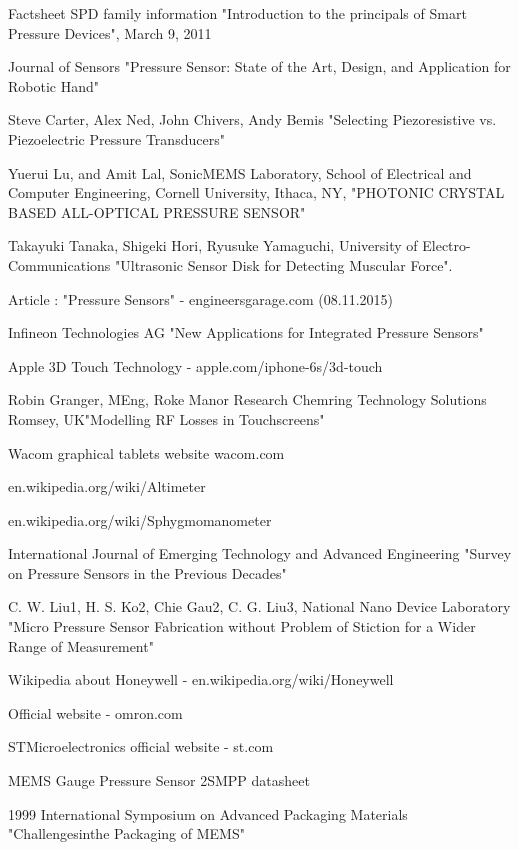 \documentclass[english]{article}
\begin{document}
\newpage

\begin{thebibliography}{1}

    Factsheet SPD family information "Introduction to the principals of Smart Pressure Devices", March 9, 2011
  
     Journal of Sensors "Pressure Sensor: State of the Art, Design, and Application for Robotic Hand"
   
     Steve Carter, Alex Ned, John Chivers, Andy Bemis "Selecting Piezoresistive vs. Piezoelectric Pressure Transducers"
   
    Yuerui Lu, and Amit Lal, SonicMEMS Laboratory, School of Electrical and Computer Engineering, Cornell University, Ithaca, NY, "PHOTONIC CRYSTAL BASED ALL-OPTICAL PRESSURE SENSOR" 
   
    Takayuki Tanaka, Shigeki Hori, Ryusuke Yamaguchi, University of Electro-Communications "Ultrasonic Sensor Disk for Detecting Muscular Force".
  
   Article : "Pressure Sensors"  -  engineersgarage.com (08.11.2015)
  
   Infineon Technologies AG "New Applications for Integrated Pressure Sensors" 
  
   Apple 3D Touch Technology - apple.com/iphone-6s/3d-touch
  
   Robin Granger, MEng, Roke Manor Research Chemring Technology Solutions Romsey, UK"Modelling RF Losses in Touchscreens"
  
   Wacom graphical tablets website wacom.com
  
   en.wikipedia.org/wiki/Altimeter
  
   en.wikipedia.org/wiki/Sphygmomanometer
  
   International Journal of Emerging Technology and Advanced Engineering "Survey on Pressure Sensors in the Previous Decades"
  
   C. W. Liu1, H. S. Ko2, Chie Gau2, C. G. Liu3, National Nano Device Laboratory "Micro Pressure Sensor Fabrication without Problem of Stiction for a Wider Range of Measurement"
  
   Wikipedia about Honeywell - en.wikipedia.org/wiki/Honeywell
  
   Official website - omron.com
  
   STMicroelectronics official website - st.com
  
   MEMS Gauge Pressure Sensor 2SMPP datasheet
  
   1999 International Symposium on Advanced Packaging Materials "Challengesinthe Packaging of MEMS"

  \end{thebibliography}
\end{document}
